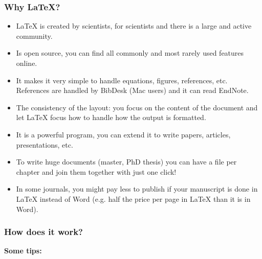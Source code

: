 \documentclass{beamer}
\def\openesc{\color{blue}}
\def\closeesc{\color{black}}
\def\vbdelim{\catcode`<=\active\catcode`>=\active%
\def<{\openesc}
\def>{\closeesc}}
\begin{document}

\begin{frame}[fragile]
\frametitle{Why \LaTeX?}
\begin{itemize}
\item \LaTeX{} is created by scientists, for scientists and there is a large and active community. \\
\pause
\item Is open source, you can find all commonly and most rarely used features online. \\
\pause
\item It makes it very simple to handle equations, figures, references, etc. References are handled by BibDesk (Mac users) and it can read EndNote. \\
\pause
\item The consistency of the layout: you focus on the content of the document and let \LaTeX{} focus how to handle how the output is formatted.\\
\pause
\item It is a powerful program, you can extend it to write papers, articles, presentations, etc.\\
\pause
\item To write huge documents (master, PhD thesis) you can have a file per chapter and join them together with just one click!\\
\pause
\item In some journals, you might pay less to publish if your manuscript is done in \LaTeX{} instead of Word (e.g. half the price per page in \LaTeX{} than it is in Word).
\end{itemize}
\end{frame}


\begin{frame}[fragile]
\frametitle{How does it work?}
\pause
\textbf{Some tips:} 
\end{frame}
\end{document}
